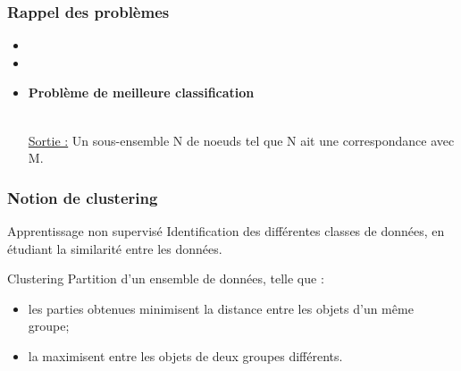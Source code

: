 \documentclass{beamer}
\begin{document}
\begin{frame}
\frametitle{Rappel des problèmes}

\begin{itemize}
\item {}
\item {}
\item \begin{flushcenter} \bf Problème de meilleure classification\end{flushcenter}\\ \uline{Sortie :} Un sous-ensemble N de noeuds tel que N ait une correspondance avec M.

\end{itemize}

\end{frame}

\begin{frame}
\frametitle{Notion de clustering}


\begin{block}{Apprentissage non supervisé}
Identification des différentes classes de données, en étudiant la similarité entre les données.
\end{block}

\pause


\begin{block}{Clustering}
Partition d'un ensemble de données, telle que :
\begin{itemize} 
\item les parties obtenues \alert{minimisent} la distance entre les objets d'un même groupe;
\item la \alert{maximisent} entre les objets de deux groupes différents.
\end{itemize}
\end{block}

\end{frame}
\end{document}
